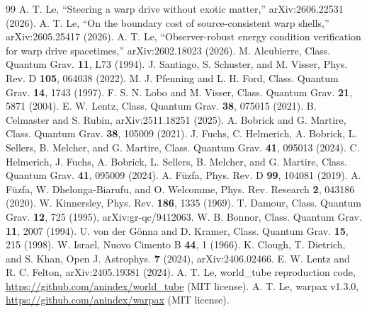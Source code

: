 \documentclass[11pt]{article}
\begin{document}
\begin{thebibliography}{99}
 A. T. Le, ``Steering a warp drive without exotic
matter,'' arXiv:2606.22531 (2026).
 A. T. Le, ``On the boundary cost of source-consistent
warp shells,'' arXiv:2605.25417 (2026).
 A. T. Le, ``Observer-robust energy condition
verification for warp drive spacetimes,'' arXiv:2602.18023 (2026).
 M. Alcubierre, Class. Quantum Grav. \textbf{11}, L73
(1994).
 J. Santiago, S. Schuster, and M. Visser, Phys. Rev. D
\textbf{105}, 064038 (2022).
 M. J. Pfenning and L. H. Ford, Class. Quantum Grav.
\textbf{14}, 1743 (1997).
 F. S. N. Lobo and M. Visser, Class. Quantum Grav.
\textbf{21}, 5871 (2004).
 E. W. Lentz, Class. Quantum Grav. \textbf{38}, 075015
(2021).
 B. Celmaster and S. Rubin, arXiv:2511.18251 (2025).
 A. Bobrick and G. Martire, Class. Quantum Grav.
\textbf{38}, 105009 (2021).
 J. Fuchs, C. Helmerich, A. Bobrick, L. Sellers,
B. Melcher, and G. Martire, Class. Quantum Grav. \textbf{41}, 095013
(2024).
 C. Helmerich, J. Fuchs, A. Bobrick, L. Sellers,
B. Melcher, and G. Martire, Class. Quantum Grav. \textbf{41}, 095009
(2024).
 A. F\"uzfa, Phys. Rev. D \textbf{99}, 104081 (2019).
 A. F\"uzfa, W. Dhelonga-Biarufu, and O. Welcomme,
Phys. Rev. Research \textbf{2}, 043186 (2020).
 W. Kinnersley, Phys. Rev. \textbf{186}, 1335 (1969).
 T. Damour, Class. Quantum Grav. \textbf{12}, 725 (1995),
arXiv:gr-qc/9412063.
 W. B. Bonnor, Class. Quantum Grav. \textbf{11}, 2007
(1994).
 U. von der G\"onna and D. Kramer, Class. Quantum Grav.
\textbf{15}, 215 (1998).
 W. Israel, Nuovo Cimento B \textbf{44}, 1 (1966).
 K. Clough, T. Dietrich, and S. Khan, Open J. Astrophys.
\textbf{7} (2024), arXiv:2406.02466.
 E. W. Lentz and R. C. Felton, arXiv:2405.19381
(2024).
 A. T. Le, world\_tube reproduction code,
\url{https://github.com/anindex/world_tube} (MIT license).
 A. T. Le, warpax v1.3.0,
\url{https://github.com/anindex/warpax} (MIT license).
\end{thebibliography}
\end{document}
